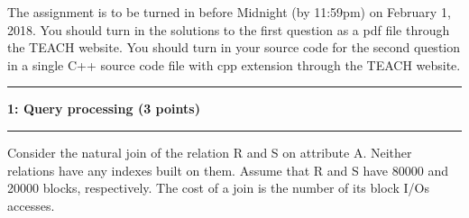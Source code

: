 \documentclass[11pt]{article}
\newcommand\question[2]{\vspace{.25in}\hrule\textbf{#1: #2}\vspace{.5em}\hrule\vspace{.10in}}
\begin{document}
\raggedright
\newcommand\NAME{Oregon State University}  %
\newcommand\ANDREWID{}     %
\newcommand\HWNUM{3}              %


The assignment is to be turned in before Midnight (by 11:59pm) on February 1, 2018. 
You should turn in the solutions to the first question as a pdf file through the TEACH website. You should turn in your source code 
for the second question in a single C++ source code file with cpp extension through the TEACH website.

\question{1}{Query processing (3 points)}
Consider the natural join of the relation R and S on attribute A. 
Neither relations have any indexes built on them. 
Assume that R and S have 80000 and 20000 blocks, respectively.
The cost of a join is the number of its block I/Os accesses.
\end{document}
